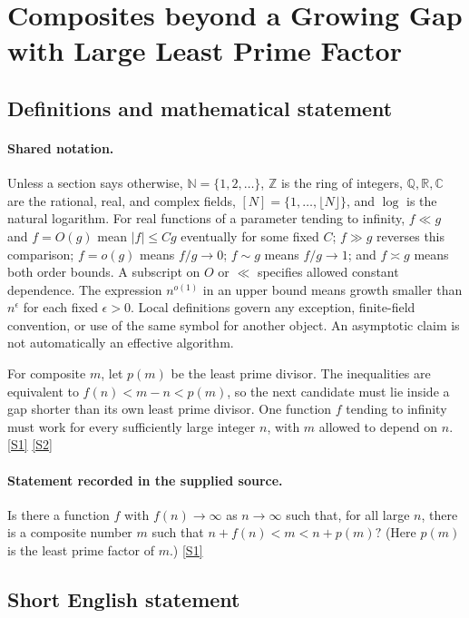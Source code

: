 \documentclass[11pt,a4paper]{article}
\newcommand{\N}{\mathbb{N}}
\newcommand{\Z}{\mathbb{Z}}
\newcommand{\Q}{\mathbb{Q}}
\newcommand{\R}{\mathbb{R}}
\newcommand{\C}{\mathbb{C}}
\newcommand{\sref}[2]{\hyperlink{source:#1:#2}{[S#2]}}
\begin{document}
\section{Composites beyond a Growing Gap with Large Least Prime Factor}\label{statement}


\subsection{Definitions and mathematical statement}

\paragraph{Shared notation.}Unless a section says otherwise, $\N=\{1,2,\ldots\}$,
$\Z$ is the ring of integers, $\Q,\R,\C$ are the rational, real, and complex
fields, $[N]=\{1,\ldots,\lfloor N\rfloor\}$, and $\log$ is the natural
logarithm. For real functions of a parameter tending to infinity,
$f\ll g$ and $f=O(g)$ mean $|f|\leq Cg$ eventually for some fixed $C$;
$f\gg g$ reverses this comparison; $f=o(g)$ means $f/g\to0$;
$f\sim g$ means $f/g\to1$; and $f\asymp g$ means both order bounds.
A subscript on $O$ or $\ll$ specifies allowed constant dependence.
The expression $n^{o(1)}$ in an upper bound means growth smaller than
$n^\epsilon$ for each fixed $\epsilon>0$. Local definitions govern any
exception, finite-field convention, or use of the same symbol for another
object. An asymptotic claim is not automatically an effective algorithm.



For composite $m$, let $p(m)$ be the least prime divisor. The inequalities are equivalent to $f(n)<m-n<p(m)$, so the next candidate must lie inside a gap shorter than its own least prime divisor. One function $f$ tending to infinity must work for every sufficiently large integer $n$, with $m$ allowed to depend on $n$. \sref{statement}{1} \sref{statement}{2}

\paragraph{Statement recorded in the supplied source.}
Is there a function $f$ with $f(n)\to \infty$ as $n\to \infty$ such that, for all large $n$, there is a composite number $m$ such that $ n+f(n)<m<n+p(m)? $ (Here $p(m)$ is the least prime factor of $m$.) \sref{statement}{1}

\subsection{Short English statement}
\end{document}
